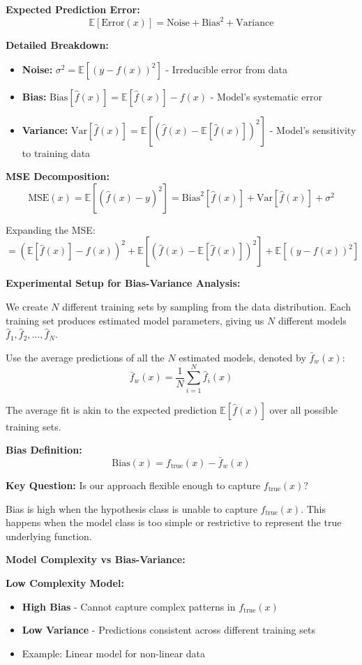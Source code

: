 \documentclass{article}
\begin{document}
\textbf{Expected Prediction Error:}
\[
\mathbb{E}[\text{Error}(x)] = \text{Noise} + \text{Bias}^2 + \text{Variance}
\]

\textbf{Detailed Breakdown:}
\begin{itemize}
    \item \textbf{Noise:} $\sigma^2 = \mathbb{E}[(y - f(x))^2]$ - Irreducible error from data
    \item \textbf{Bias:} $\text{Bias}[\hat{f}(x)] = \mathbb{E}[\hat{f}(x)] - f(x)$ - Model's systematic error
    \item \textbf{Variance:} $\text{Var}[\hat{f}(x)] = \mathbb{E}[(\hat{f}(x) - \mathbb{E}[\hat{f}(x)])^2]$ - Model's sensitivity to training data
\end{itemize}

\textbf{MSE Decomposition:}
\[
\text{MSE}(x) = \mathbb{E}[(\hat{f}(x) - y)^2] = \text{Bias}^2[\hat{f}(x)] + \text{Var}[\hat{f}(x)] + \sigma^2
\]

Expanding the MSE:
\[
= (\mathbb{E}[\hat{f}(x)] - f(x))^2 + \mathbb{E}[(\hat{f}(x) - \mathbb{E}[\hat{f}(x)])^2] + \mathbb{E}[(y - f(x))^2]
\]

\textbf{Experimental Setup for Bias-Variance Analysis:}

We create $N$ different training sets by sampling from the data distribution. Each training set produces estimated model parameters, giving us $N$ different models $\hat{f}_1, \hat{f}_2, \ldots, \hat{f}_N$.

Use the average predictions of all the $N$ estimated models, denoted by $\bar{f}_w(x)$:
\[
\bar{f}_w(x) = \frac{1}{N}\sum_{i=1}^{N} \hat{f}_i(x)
\]

The average fit is akin to the expected prediction $\mathbb{E}[\hat{f}(x)]$ over all possible training sets.

\textbf{Bias Definition:}
\[
\text{Bias}(x) = f_{\text{true}}(x) - \bar{f}_w(x)
\]

\textbf{Key Question:} Is our approach flexible enough to capture $f_{\text{true}}(x)$?

Bias is high when the hypothesis class is unable to capture $f_{\text{true}}(x)$. This happens when the model class is too simple or restrictive to represent the true underlying function.

\textbf{Model Complexity vs Bias-Variance:}

\textbf{Low Complexity Model:}
\begin{itemize}
    \item \textbf{High Bias} - Cannot capture complex patterns in $f_{\text{true}}(x)$
    \item \textbf{Low Variance} - Predictions consistent across different training sets
    \item Example: Linear model for non-linear data
\end{itemize}
\end{document}
